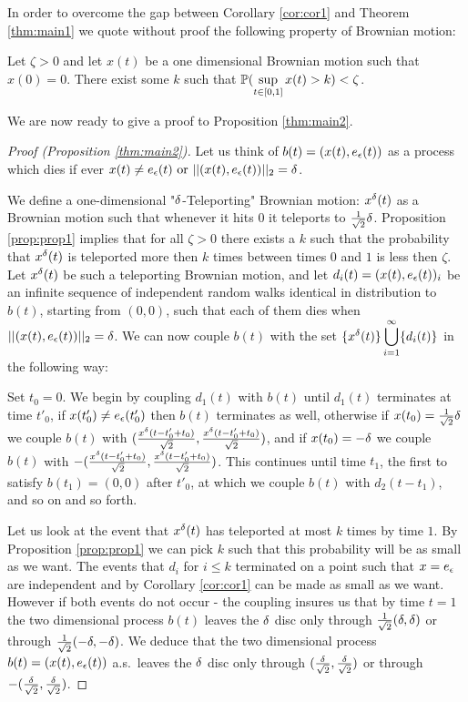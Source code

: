 {In order to overcome the gap between Corollary \ref{cor:cor1} and
Theorem \ref{thm:main1} we quote without proof the following property of Brownian
motion:
\begin{propos}\label{prop:prop1}
Let $\zeta>0$ and let $x(t)$ be a one dimensional Brownian
motion such that $x(0)=0$. There exist some $k$ such that
$\mathbb{P}(\displaystyle\sup_{t\in[0,1]}x(t)>k) <\zeta$.
\end{propos}

We are now ready to give a proof to Proposition \ref{thm:main2}.

\begin{proof}[Proof (Proposition \ref{thm:main2})]
\newcommand{\hitradius}[1]{\twonorm{\twodproc{#1}}=\radius}

Let us think of $b(t)=(x(t), e_\epsilon(t))$ as a process which dies if ever $x(t)\neq e_\epsilon(t)
\text{ or } ||(x(t), e_\epsilon(t))||_2 = \delta$.

We define a one-dimensional "$\delta$-Teleporting" Brownian motion: $x^{\delta}(t)$
 as a Brownian motion such that whenever it hits $0$ it teleports to $\frac1{\sqrt{2}}\delta$.
Proposition \ref{prop:prop1} implies that for all $\zeta>0$ there exists a $k$ such that the probability
that $x^{\delta}(t)$ is teleported more then $k$ times between times $0$ and $1$ is less then $\zeta$. Let $x^{\delta}(t)$ be such a teleporting Brownian motion, and let
 $d_i(t)=(x(t), e_\epsilon(t))_i$ be an infinite sequence
 of independent random walks identical in distribution to $b(t)$, starting from $(0,0)$, such that each
 of them dies when $||(x(t), e_\epsilon(t))||_2 = \delta$. We can now couple $b(t)$ with the set $\{x^\delta(t)\}\displaystyle\bigcup_{i=1}^\infty\{d_i(t)\}$ in the following way:

Set $t_0=0$. We begin by coupling $d_1(t)$ with $b(t)$ until $d_1(t)$ terminates at 
time $t'_0$, if $x(t'_0)\neq e_\epsilon(t'_0)$ then $b(t)$ terminates as well, otherwise
 if $x(t_0)=\frac1{\sqrt{2}}\delta$ we couple $b(t)$ with $(\frac{x^\delta(t-t'_0+t_0)}{\sqrt{2}},\frac{x^\delta(t-t'_0+t_0)}{\sqrt{2}})$,
  and if $x(t_0)=-\delta$ we couple $b(t)$ with $-(\frac{x^\delta(t-t'_0+t_0)}{\sqrt{2}},\frac{x^\delta(t-t'_0+t_0)}{\sqrt{2}})$.
 This continues until time $t_1$, the first to satisfy $b(t_1)=(0,0)$ after $t'_0$, 
 at which we couple $b(t)$ with $d_2(t-t_1)$, and so on and so forth.

Let us look at the event that $x^\delta(t)$ has teleported at most $k$ times by time $1$.
 By Proposition \ref{prop:prop1} we can pick $k$ such that this probability will be as small 
 as we want. The events that $d_i$ for $i\le k$ terminated on a point such that $x=e_\epsilon$ 
 are independent and by Corollary \ref{cor:cor1} can be made as small as we want. However
  if both events do not occur - the coupling insures us that by time $t=1$ the two
   dimensional process $b(t)$
leaves the $\delta$ disc only through
$\frac1{\sqrt2}(\delta,\delta)$ or through
$\frac1{\sqrt2}(-\delta,-\delta)$. We deduce that the two dimensional process $b(t)=(x(t), e_\epsilon(t))$
a.s.\ leaves the $\delta$ disc only through $(\frac{\delta}{\sqrt2},\frac{\delta}{\sqrt2})$ or through $-(\frac{\delta}{\sqrt2},\frac{\delta}{\sqrt2})$.


\end{proof}}

